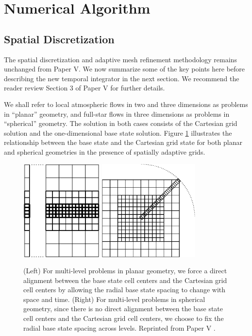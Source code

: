 \section{Numerical Algorithm}\label{eq:algorithm}
\subsection{Spatial Discretization}\label{Sec:Spatial}
The spatial discretization and adaptive mesh refinement methodology remains unchanged from Paper V.
We now summarize some of the key points here before describing the new temporal integrator in the next section.
We recommend the reader review Section 3 of Paper V for further details.

We shall refer to local atmospheric flows in two and three dimensions as problems in ``planar'' geometry, and full-star flows
in three dimensions as problems in ``spherical'' geometry.
The solution in both cases consists of the Cartesian grid solution
and the one-dimensional base state solution.
Figure \ref{Fig:BaseGrid} illustrates the relationship between the base state and the Cartesian grid state for both planar and spherical geometries in the presence of spatially adaptive grids. 
\begin{figure}[tb]
\centering
\includegraphics[height=2.0in]{./figs/base_grid} \hspace{0.5in}
\includegraphics[height=2.0in]{./figs/base_spherical}
\caption{\label{Fig:BaseGrid}  
(Left) For multi-level problems in planar geometry, we force a direct alignment
between the base state cell centers and the Cartesian grid cell centers by 
allowing the radial base state spacing to change with space and time.
(Right) For multi-level problems in spherical geometry, since there is no direct alignment
between the base state cell centers and the Cartesian grid cell centers, we choose to fix
the radial base state spacing across levels. Reprinted from Paper V \citep{MAESTRO_V}. }
\end{figure}
